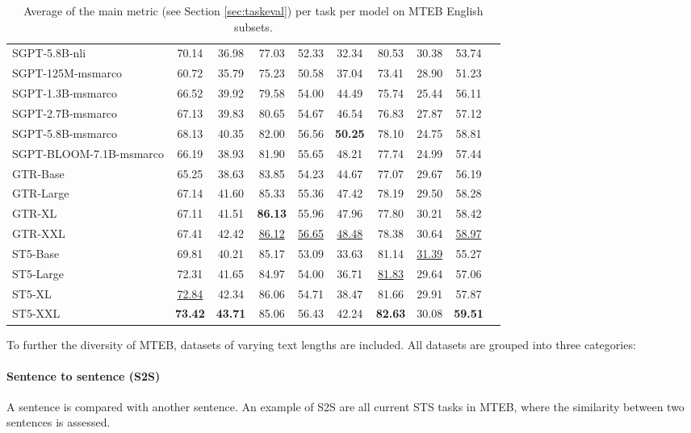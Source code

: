 \documentclass[11pt]{article}
\begin{document}
\begin{table*}[t!]
{\begin{tabular}{l|ccccccccc}
SGPT-5.8B-nli & 70.14 & 36.98 & 77.03 & 52.33 & 32.34 & 80.53 & 30.38 & 53.74 \\
SGPT-125M-msmarco & 60.72 & 35.79 & 75.23 & 50.58 & 37.04 & 73.41 & 28.90 & 51.23 \\
SGPT-1.3B-msmarco & 66.52 & 39.92 & 79.58 & 54.00 & 44.49 & 75.74 & 25.44 & 56.11 \\
SGPT-2.7B-msmarco & 67.13 & 39.83 & 80.65 & 54.67 & 46.54 & 76.83 & 27.87 & 57.12 \\
SGPT-5.8B-msmarco & 68.13 & 40.35 & 82.00 & 56.56 & \textbf{50.25} & 78.10 & 24.75 & 58.81 \\
SGPT-BLOOM-7.1B-msmarco & 66.19 & 38.93 & 81.90 & 55.65 & 48.21 & 77.74 & 24.99 & 57.44 \\
GTR-Base & 65.25 & 38.63 & 83.85 & 54.23 & 44.67 & 77.07 & 29.67 & 56.19 \\
GTR-Large & 67.14 & 41.60 & 85.33 & 55.36 & 47.42 & 78.19 & 29.50 & 58.28 \\
GTR-XL & 67.11 & 41.51 & \textbf{86.13} & 55.96 & 47.96 & 77.80 & 30.21 & 58.42 \\
GTR-XXL & 67.41 & 42.42 & \underline{86.12} & \underline{56.65} & \underline{48.48} & 78.38 & 30.64 & \underline{58.97} \\
ST5-Base & 69.81 & 40.21 & 85.17 & 53.09 & 33.63 & 81.14 & \underline{31.39} & 55.27 \\
ST5-Large & 72.31 & 41.65 & 84.97 & 54.00 & 36.71 & \underline{81.83} & 29.64 & 57.06 \\
ST5-XL & \underline{72.84} & 42.34 & 86.06 & 54.71 & 38.47 & 81.66 & 29.91 & 57.87 \\
ST5-XXL & \textbf{73.42} & \textbf{43.71} & 85.06 & 56.43 & 42.24 & \textbf{82.63} & 30.08 & \textbf{59.51} \\
    \bottomrule
    \end{tabular}}
    \caption{Average of the main metric (see Section \ref{sec:taskeval}) per task per model on MTEB English subsets.}
    \label{tab:results}
\end{table*}

To further the diversity of MTEB, datasets of varying text lengths are included. All datasets are grouped into three categories:

\paragraph{Sentence to sentence (S2S)} A sentence is compared with another sentence. An example of S2S are all current STS tasks in MTEB, where the similarity between two sentences is assessed. 
\end{document}
